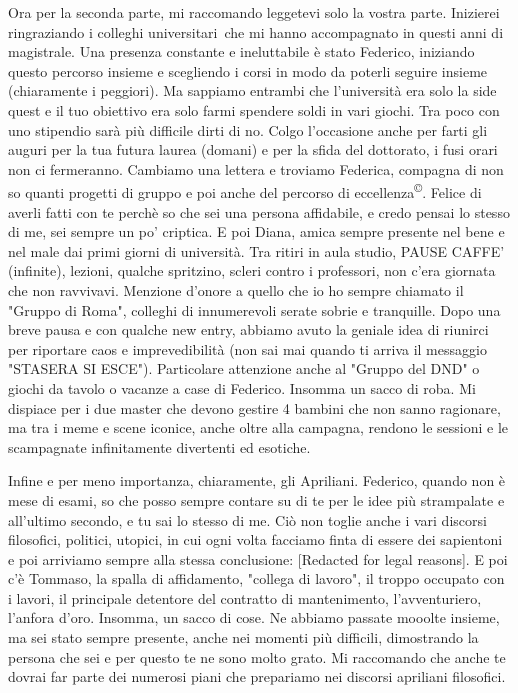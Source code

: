 \documentclass[binding=0.6cm]{sapthesis}
\begin{document}
\begin{acknowledgments}
	Ora per la seconda parte, mi raccomando leggetevi solo la vostra parte.
	Inizierei ringraziando i colleghi universitari\texttrademark~che mi hanno accompagnato in questi anni di magistrale. Una presenza constante e ineluttabile è stato Federico, iniziando questo percorso insieme e scegliendo i corsi in modo da poterli seguire insieme (chiaramente i peggiori). Ma sappiamo entrambi che l'università era solo la side quest e il tuo obiettivo era solo farmi spendere soldi in vari giochi. Tra poco con uno stipendio sarà più difficile dirti di no. Colgo l'occasione anche per farti gli auguri per la tua futura laurea (domani) e per la sfida del dottorato, i fusi orari non ci fermeranno.
	Cambiamo una lettera e troviamo Federica, compagna di non so quanti progetti di gruppo e poi anche del percorso di eccellenza\textsuperscript{\copyright}. Felice di averli fatti con te perchè so che sei una persona affidabile, e credo pensai lo stesso di me, sei sempre un po' criptica.
	E poi Diana, amica sempre presente nel bene e nel male dai primi giorni di università. Tra ritiri in aula studio, PAUSE CAFFE' (infinite), lezioni, qualche spritzino, scleri contro i professori, non c'era giornata che non ravvivavi.
	Menzione d'onore a quello che io ho sempre chiamato il "Gruppo di Roma", colleghi di innumerevoli serate sobrie e tranquille. Dopo una breve pausa e con qualche new entry, abbiamo avuto la geniale idea di riunirci per riportare caos e imprevedibilità (non sai mai quando ti arriva il messaggio "STASERA SI ESCE").
	Particolare attenzione anche al "Gruppo del DND" o giochi da tavolo o vacanze a case di Federico. Insomma un sacco di roba.  Mi dispiace per i due master che devono gestire 4 bambini che non sanno ragionare, ma tra i meme e scene iconice, anche oltre alla campagna, rendono le sessioni e le scampagnate infinitamente divertenti ed esotiche.

	Infine e per meno importanza, chiaramente, gli Apriliani\texttrademark.
	Federico, quando non è mese di esami, so che posso sempre contare su di te per le idee più strampalate e all'ultimo secondo, e tu sai lo stesso di me. Ciò non toglie anche i vari discorsi filosofici, politici, utopici, in cui ogni volta facciamo finta di essere dei sapientoni e poi arriviamo sempre alla stessa conclusione: [Redacted for legal reasons].
	E poi c'è Tommaso, la spalla di affidamento, "collega di lavoro", il troppo occupato con i lavori, il principale detentore del contratto di mantenimento, l'avventuriero, l'anfora d'oro. Insomma, un sacco di cose. Ne abbiamo passate mooolte insieme, ma sei stato sempre presente, anche nei momenti più difficili, dimostrando la persona che sei e per questo te ne sono molto grato. Mi raccomando che anche te dovrai far parte dei numerosi piani che prepariamo nei discorsi apriliani filosofici.


\end{acknowledgments}
\end{document}
